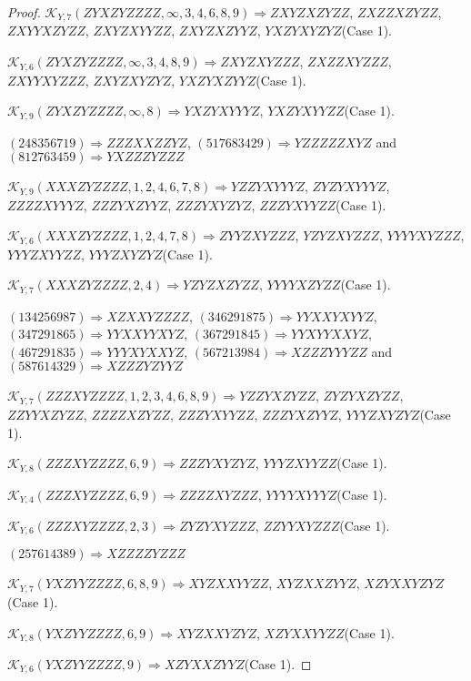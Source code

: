 \documentclass[12pt]{article}
\theoremstyle{plain}
\theoremstyle{definition}
\theoremstyle{remark}
\newcommand{\fancy}[1]{\mathcal{#1}}
\def\K{\fancy{K}}
\begin{document}
\begin{proof}
	
	$\K_{Y,7}(ZYXZYZZZZ,\infty,3, 4, 6, 8, 9)\Rightarrow $$ZXYZXZYZZ$, $ZXZZXZYZZ$, $ZXYYXZYZZ$, $ZXYZXYYZZ$, $ZXYZXZYYZ$, $YXZYXYZYZ$(Case 1).
	
	$\K_{Y,6}(ZYXZYZZZZ,\infty,3, 4, 8, 9)\Rightarrow $$ZXYZXYZZZ$, $ZXZZXYZZZ$, $ZXYYXYZZZ$, $ZXYZXYZYZ$, $YXZYXZYYZ$(Case 1).
	
	$\K_{Y,9}(ZYXZYZZZZ,\infty,8)\Rightarrow $$YXZYXYYYZ$, $YXZYXYYZZ$(Case 1).
	
	
	
	$(2 4 8 3 5 6 7 1 9)\Rightarrow ZZZXXZZYZ$, $(5 1 7 6 8 3 4 2 9)\Rightarrow YZZZZZXYZ$ and $(8 1 2 7 6 3 4 5 9)\Rightarrow YXZZZYZZZ$
	
	
	$\K_{Y,9}(XXXZYZZZZ,1, 2, 4, 6, 7, 8)\Rightarrow $$YZZYXYYYZ$, $ZYZYXYYYZ$, $ZZZZXYYYZ$, $ZZZYXZYYZ$, $ZZZYXYZYZ$, $ZZZYXYYZZ$(Case 1).
	
	$\K_{Y,6}(XXXZYZZZZ,1, 2, 4, 7, 8)\Rightarrow $$ZYYZXYZZZ$, $YZYZXYZZZ$, $YYYYXYZZZ$, $YYYZXYYZZ$, $YYYZXYZYZ$(Case 1).
	
	$\K_{Y,7}(XXXZYZZZZ,2, 4)\Rightarrow $$YZYZXZYZZ$, $YYYYXZYZZ$(Case 1).
	
	
	
	$(1 3 4 2 5 6 9 8 7)\Rightarrow XZXXYZZZZ$, $(3 4 6 2 9 1 8 7 5)\Rightarrow YYXXYXYYZ$, $(3 4 7 2 9 1 8 6 5)\Rightarrow YYXXYYXYZ$, $(3 6 7 2 9 1 8 4 5)\Rightarrow YYXYYXXYZ$, $(4 6 7 2 9 1 8 3 5)\Rightarrow YYYXYXXYZ$, $(5 6 7 2 1 3 9 8 4)\Rightarrow XZZZYYYZZ$ and $(5 8 7 6 1 4 3 2 9)\Rightarrow XZZZYZYYZ$
	
	
	$\K_{Y,7}(ZZZXYZZZZ,1, 2, 3, 4, 6, 8, 9)\Rightarrow $$YZZYXZYZZ$, $ZYZYXZYZZ$, $ZZYYXZYZZ$, $ZZZZXZYZZ$, $ZZZYXYYZZ$, $ZZZYXZYYZ$, $YYYZXYZYZ$(Case 1).
	
	$\K_{Y,8}(ZZZXYZZZZ,6, 9)\Rightarrow $$ZZZYXYZYZ$, $YYYZXYYZZ$(Case 1).
	
	$\K_{Y,4}(ZZZXYZZZZ,6, 9)\Rightarrow $$ZZZZXYZZZ$, $YYYYXYYYZ$(Case 1).
	
	$\K_{Y,6}(ZZZXYZZZZ,2, 3)\Rightarrow $$ZYZYXYZZZ$, $ZZYYXYZZZ$(Case 1).
	
	
	
	$(2 5 7 6 1 4 3 8 9)\Rightarrow XZZZZYZZZ$
	
	
	$\K_{Y,7}(YXZYYZZZZ,6, 8, 9)\Rightarrow $$XYZXXYYZZ$, $XYZXXZYYZ$, $XZYXXYZYZ$(Case 1).
	
	$\K_{Y,8}(YXZYYZZZZ,6, 9)\Rightarrow $$XYZXXYZYZ$, $XZYXXYYZZ$(Case 1).
	
	$\K_{Y,6}(YXZYYZZZZ,9)\Rightarrow $$XZYXXZYYZ$(Case 1).
	
	
	

\end{proof}
\end{document}
